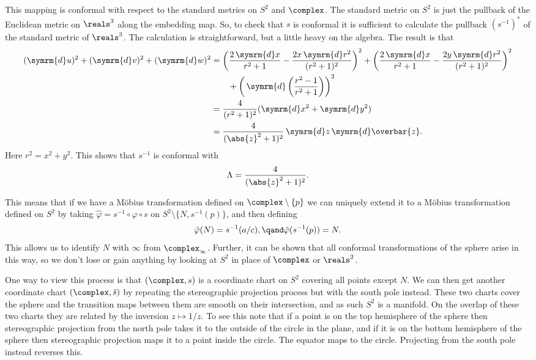 \documentclass[fleqn]{NotesClass}
\renewcommand{\dd}[1]{\,\symrm{d}#1}
\renewcommand{\dl}[1]{\symrm{d}#1}
\begin{document}
    This mapping is conformal with respect to the standard metrics on \(S^2\) and \(\complex\).
    The standard metric on \(S^2\) is just the pullback of the Euclidean metric on \(\reals^3\) along the embedding map.
    So, to check that \(s\) is conformal it is sufficient to calculate the pullback \((s^{-1})^*\) of the standard metric of \(\reals^3\).
    The calculation is straightforward, but a little heavy on the algebra.
    The result is that
    \begin{align}
        (\dl{u})^2 + (\dl{v})^2 + (\dl{w})^2 &= \left( \frac{2\dd{x}}{r^2 + 1} - \frac{2x \dd{r^2}}{(r^2 + 1)^2} \right)^2 + \left( \frac{2\dd{x}}{r^2 + 1} - \frac{2y \dd{r^2}}{(r^2 + 1)^2} \right)^2 \notag\\
        &\qquad + \left( \dd{\left( \frac{r^2 - 1}{r^2 + 1} \right)} \right)^2\\
        &= \frac{4}{(r^2 + 1)^2}(\dl{x^2} + \dl{y^2})\\
        &= \frac{4}{(\abs{z}^2 + 1)^2} \dd{z}\dd{\overbar{z}}.
    \end{align}
    Here \(r^2 = x^2 + y^2\).
    This shows that \(s^{-1}\) is conformal with
    \begin{equation}
        \Lambda = \frac{4}{(\abs{z}^2 + 1)^2}.
    \end{equation}
    
    This means that if we have a M\"obius transformation defined on \(\complex\setminus\{p\}\) we can uniquely extend it to a M\"obius transformation defined on \(S^2\) by taking \(\hat{\varphi} = s^{-1} \circ \varphi \circ s\) on \(S^2 \setminus \{N, s^{-1}(p)\}\), and then defining
    \begin{equation}
        \hat{\varphi}(N) = s^{-1}(a / c), \qand \hat{\varphi}(s^{-1}(p)) = N.
    \end{equation}
    This allows us to identify \(N\) with \(\infty\) from \(\complex_{\infty}\).
    Further, it can be shown that all conformal transformations of the sphere arise in this way, so we don't lose or gain anything by looking at \(S^2\) in place of \(\complex\) or \(\reals^2\).
    
    One way to view this process is that \((\complex, s)\) is a coordinate chart on \(S^2\) covering all points except \(N\).
    We can then get another coordinate chart \((\complex, \tilde{s})\) by repeating the stereographic projection process but with the south pole instead.
    These two charts cover the sphere and the transition maps between them are smooth on their intersection, and as such \(S^2\) is a manifold.
    On the overlap of these two charts they are related by the inversion \(z \mapsto 1/z\).
    To see this note that if a point is on the top hemisphere of the sphere then stereographic projection from the north pole takes it to the outside of the circle in the plane, and if it is on the bottom hemisphere of the sphere then stereographic projection maps it to a point inside the circle.
    The equator maps to the circle.
    Projecting from the south pole instead reverses this.
    
\end{document}
